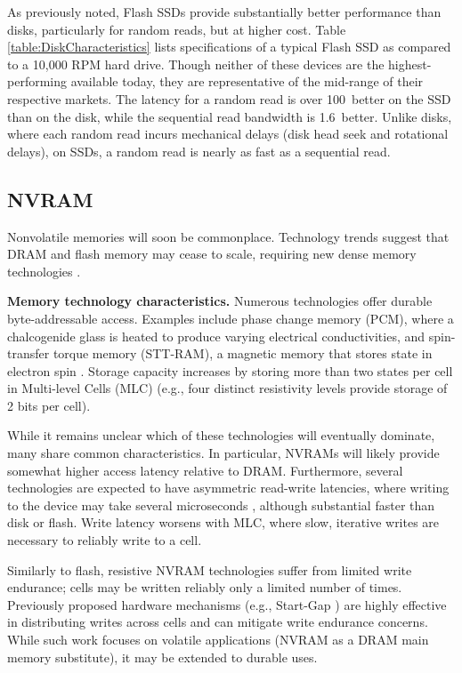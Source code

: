 As previously noted, Flash SSDs provide substantially better performance than disks, particularly for random reads, but at higher cost.
Table \ref{table:DiskCharacteristics} lists specifications of a typical Flash SSD as compared to a 10,000 RPM hard drive.
Though neither of these devices are the highest-performing available today, they are representative of the mid-range of their respective markets.
The latency for a random read is over 100\texttimes~better on the SSD than on the disk, while the sequential read bandwidth is 1.6\texttimes~better. 
Unlike disks, where each random read incurs mechanical delays (disk head seek and rotational delays), on SSDs, a random read is nearly as fast as a sequential read.  

\subsection{NVRAM}
\label{sec:Background:NVRAM}

Nonvolatile memories will soon be commonplace.
Technology trends suggest that DRAM and flash memory may cease to scale, requiring new dense memory technologies \cite{LeeIpek09}.

\textbf{Memory technology characteristics.}
Numerous technologies offer durable byte-addressable access.
Examples include phase change memory (PCM), where a chalcogenide glass is heated to produce varying electrical conductivities, and spin-transfer torque memory (STT-RAM), a magnetic memory that stores state in electron spin \cite{BurrKurdi08}.
Storage capacity increases by storing more than two states per cell in Multi-level Cells (MLC) (e.g., four distinct resistivity levels provide storage of 2 bits per cell).

While it remains unclear which of these technologies will eventually dominate, many share common characteristics.
In particular, NVRAMs will likely provide somewhat higher access latency relative to DRAM.
Furthermore, several technologies are expected to have asymmetric read-write latencies, where writing to the device may take several microseconds \cite{QureshiSrinivasan09}, although substantial faster than disk or flash.
Write latency worsens with MLC, where slow, iterative writes are necessary to reliably write to a cell.

Similarly to flash, resistive NVRAM technologies suffer from limited write endurance; cells may be written reliably only a limited number of times.
Previously proposed hardware mechanisms (e.g., Start-Gap \cite{QureshiKaridis09}) are highly effective in distributing writes across cells and can mitigate write endurance concerns.
While such work focuses on volatile applications (NVRAM as a DRAM main memory substitute), it may be extended to durable uses.

